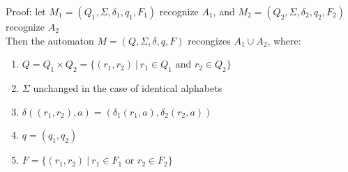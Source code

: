 \documentclass{article}
\newcommand*{\<}{\langle}
\renewcommand*{\>}{\rangle}
\begin{document}
			Proof: let $M_1 = (Q_1, \Sigma, \delta_1, q_1, F_1)$ recognize $A_1$, and $M_2 = (Q_2, \Sigma, \delta_2, q_2, F_2)$ recognize $A_2$ \\
			Then the automaton $M = (Q, \Sigma, \delta, q, F)$ recongizes $A_1 \cup A_2$, where:
			\begin{enumerate}
				\item $Q = Q_1 \times Q_2 = \{(r_1, r_2)\:|\:r_1 \in Q_1 \text{ and } r_2 \in Q_2\}$
				\item $\Sigma$ unchanged in the case of identical alphabets
				\item $\delta((r_1, r_2), a) = (\delta_1(r_1, a), \delta_2(r_2, a))$
				\item $q = (q_1, q_2)$
				\item $F = \{(r_1, r_2)\:|\:r_1 \in F_1 \text{ or } r_2 \in F_2\}$
				\end{enumerate}
\end{document}
